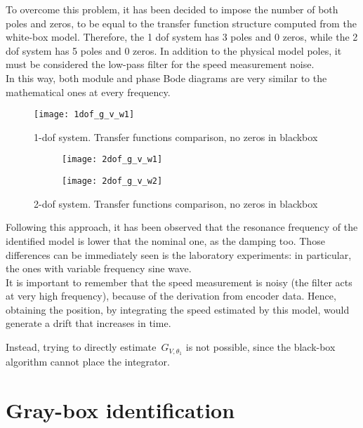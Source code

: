 To overcome this problem, it has been decided to impose the number of both poles and zeros, to be equal to the transfer function structure computed from the white-box model. Therefore, the 1 dof system has 3 poles and 0 zeros, while the 2 dof system has 5 poles and 0 zeros.
In addition to the physical model poles, it must be considered the low-pass filter for the speed measurement noise. \\
In this way, both module and phase Bode diagrams are very similar to the mathematical ones at every frequency.

\begin{figure*}[h]
	\centering
	\texttt{[image: 1dof\_g\_v\_w1]}
	\caption{1-dof system. Transfer functions comparison, no zeros in blackbox}
\end{figure*}

\begin{figure*}[h]
	\centering
	\begin{subfigure}{0.45\columnwidth}
		\texttt{[image: 2dof\_g\_v\_w1]}
	\end{subfigure}
	\begin{subfigure}{0.45\columnwidth}
		\texttt{[image: 2dof\_g\_v\_w2]}
	\end{subfigure}
	\caption{2-dof system. Transfer functions comparison, no zeros in blackbox}
\end{figure*}

Following this approach, it has been observed that the resonance frequency of the identified model is lower that the nominal one, as the damping too.
Those differences can be immediately seen is the laboratory experiments: in particular, the ones with variable frequency sine wave. \\
It is important to remember that the speed measurement is noisy (the filter acts at very high frequency), because of the derivation from encoder data. Hence, obtaining the position, by integrating the speed estimated by this model, would generate a drift that increases in time.

Instead, trying to directly estimate~$G_{V,\theta_1}$ is not possible, since the black-box algorithm cannot place the integrator.

\section{Gray-box identification} \label{sec:gray_b_id}

